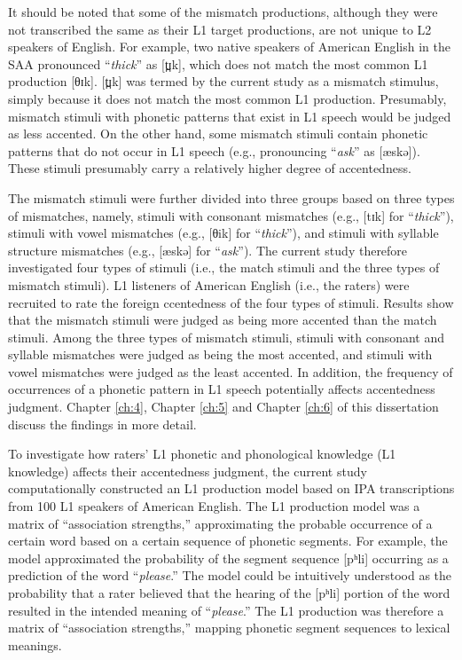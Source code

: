 It should be noted that some of the mismatch productions, although they were not transcribed the same as their L1 target productions, are not unique to L2 speakers of English. For example, two native speakers of American English in the SAA pronounced “\textit{thick}” as [t̪ɪk], which does not match the most common L1 production [θɪk]. [t̪ɪk] was termed by the current study as a mismatch stimulus, simply because it does not match the most common L1 production. Presumably, mismatch stimuli with phonetic patterns that exist in L1 speech would be judged as less accented. On the other hand, some mismatch stimuli contain phonetic patterns that do not occur in L1 speech (e.g., pronouncing “\textit{ask}” as [æskə]). These stimuli presumably carry a relatively higher degree of accentedness. 

The mismatch stimuli were further divided into three groups based on three types of mismatches, namely, stimuli with consonant mismatches (e.g.,  [tɪk] for “\textit{thick}”), stimuli with vowel mismatches (e.g., [θik] for “\textit{thick}”), and stimuli with syllable structure mismatches (e.g., [æskə] for “\textit{ask}”). The current study therefore investigated four types of stimuli (i.e., the match stimuli and the three types of mismatch stimuli). L1 listeners of American English (i.e., the raters) were recruited to rate the foreign ccentedness of the four types of stimuli. Results show that the mismatch stimuli were judged as being more accented than the match stimuli. Among the three types of mismatch stimuli, stimuli with consonant and syllable mismatches were judged as being the most accented, and stimuli with vowel mismatches were judged as the least accented. In addition, the frequency of occurrences of a phonetic pattern in L1 speech potentially affects accentedness judgment. Chapter \ref{ch:4}, Chapter \ref{ch:5} and Chapter \ref{ch:6} of this dissertation discuss the findings in more detail. 


To investigate how raters’ L1 phonetic and phonological knowledge (L1 knowledge) affects their accentedness judgment, the current study computationally constructed an L1 production model based on IPA transcriptions from 100 L1 speakers of American English. The L1 production model was a matrix of “association strengths,” approximating the probable occurrence of a certain word based on a certain sequence of phonetic segments. For example, the model approximated the probability of the segment sequence [pʰli] occurring as a prediction of the word “\textit{please}.”  The model could be intuitively understood as the probability that a rater believed that the hearing of the [pʰli] portion of the word resulted in the intended meaning of “\textit{please}.” The L1 production was therefore a matrix of “association strengths,” mapping phonetic segment sequences to lexical meanings.

